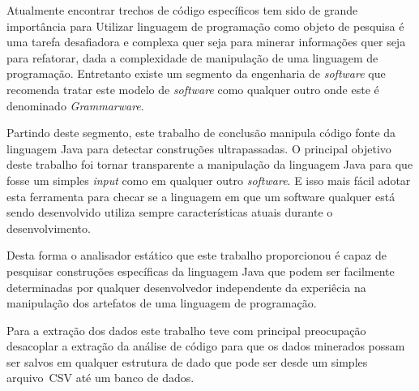 Atualmente encontrar trechos de código específicos tem sido de grande importância para Utilizar linguagem de programa\c{c}\~{a}o como objeto de pesquisa \'{e} uma tarefa desafiadora e complexa quer seja para minerar informa\c{c}\~{o}es quer seja para refatorar, dada a complexidade de manipula\c{c}\~{a}o de uma linguagem de programa\c{c}\~{a}o. Entretanto existe um segmento da engenharia de \textit{software} que recomenda tratar este modelo de \textit{software} como qualquer outro onde este \'{e} denominado \textit{Grammarware}. 

Partindo deste segmento, este trabalho de conclus\~{a}o manipula c\'{o}digo fonte da linguagem Java para detectar constru\c{c}\~{o}es ultrapassadas. O principal objetivo deste trabalho foi tornar transparente a manipula\c{c}\~{a}o da linguagem Java para que fosse um simples \textit{input} como em qualquer outro \textit{software}. E isso mais f\'{a}cil adotar esta ferramenta para checar se a linguagem em que um software qualquer est\'{a} sendo desenvolvido utiliza sempre caracter\'{i}sticas atuais durante o desenvolvimento.

Desta forma o analisador est\'{a}tico que este trabalho proporcionou \'{e} capaz de pesquisar constru\c{c}\~{o}es espec\'{i}ficas da linguagem Java que podem ser facilmente determinadas por qualquer desenvolvedor independente da experi\^{e}cia na manipula\c{c}\~{a}o dos artefatos de uma linguagem de programa\c{c}\~{a}o.

Para a extra\c{c}\~{a}o dos dados este trabalho teve com principal preocupa\c{c}\~{a}o desacoplar a extra\c{c}\~{a}o da an\'{a}lise de c\'{o}digo para que os dados minerados possam ser salvos em qualquer estrutura de dado que pode ser desde um simples arquivo~\acs{CSV} at\'{e} um banco de dados.

